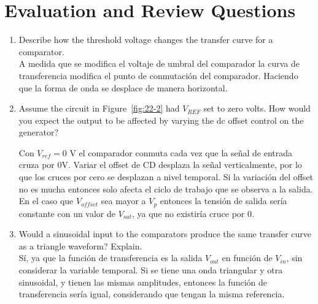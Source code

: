 \documentclass[11pt]{article}
\begin{document}
\vspace{9cm}

\newpage
\section*{Evaluation and Review Questions}

\begin{enumerate}[label=\arabic*.]
    \item Describe how the threshold voltage changes the transfer curve for a comparator.\\
	A medida que se modifica el voltaje de umbral del comparador la curva de transferencia modifica el punto de conmutación del comparador. Haciendo que la forma de onda se desplace de manera horizontal. 
    \vspace{0.25cm}
    

    \item Assume the circuit in Figure~\ref{fig:22-2} had $V_{REF}$ set to zero volts. How would you expect the output to be affected by varying the dc offset control on the generator?
    
    \vspace{0.5cm}
    Con $V_{ref} = 0\text{ V}$ el comparador conmuta cada vez que la señal de entrada cruza por $0 \text{V}$. Variar el offset de CD desplaza la señal verticalmente, por lo que los cruces por cero se desplazan a nivel temporal. Si la variación del offset no es mucha entonces solo afecta el ciclo de trabajo que se observa a la salida. En el caso que $V_{offset}$ sea mayor a $V_{p}$ entonces la tensión de salida sería constante con un valor de $V_{sat}$, ya que no existiría cruce por $0$.

    

    \item Would a sinusoidal input to the comparators produce the same transfer curve as a triangle waveform? Explain.\\
    
    Sí, ya que la función de transferencia es la salida $V_{out}$ en función de $V_{in}$, sin considerar la variable temporal. Si se tiene una onda triangular y otra sinusoidal, y tienen las mismas amplitudes, entonces la función de transferencia sería igual, considerando que tengan la misma referencia.

    \vspace{0.5cm}


\end{enumerate}
\end{document}
